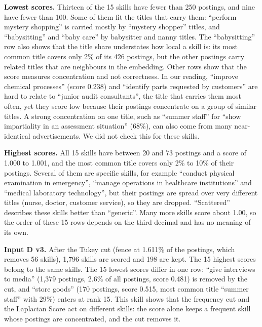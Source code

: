 \documentclass[
  letterpaper,
  DIV=11,
  numbers=noendperiod,
  sfdefaults=false]{scrartcl}
\begin{document}
\textbf{Lowest scores.} Thirteen of the 15 skills have fewer than 250
postings, and nine have fewer than 100. Some of them fit the titles that
carry them: ``perform mystery shopping'' is carried mostly by ``mystery
shopper'' titles, and ``babysitting'' and ``baby care'' by babysitter
and nanny titles. The ``babysitting'' row also shows that the title
share understates how local a skill is: its most common title covers
only 2\% of its 426 postings, but the other postings carry related
titles that are neighbours in the embedding. Other rows show that the
score measures concentration and not correctness. In our reading,
``improve chemical processes'' (score 0.238) and ``identify parts
requested by customers'' are hard to relate to ``junior audit
consultants'', the title that carries them most often, yet they score
low because their postings concentrate on a group of similar titles. A
strong concentration on one title, such as ``summer staff'' for ``show
impartiality in an assessment situation'' (68\%), can also come from
many near-identical advertisements. We did not check this for these
skills.

\textbf{Highest scores.} All 15 skills have between 20 and 73 postings
and a score of 1.000 to 1.001, and the most common title covers only 2\%
to 10\% of their postings. Several of them are specific skills, for
example ``conduct physical examination in emergency'', ``manage
operations in healthcare institutions'' and ``medical laboratory
technology'', but their postings are spread over very different titles
(nurse, doctor, customer service), so they are dropped. ``Scattered''
describes these skills better than ``generic''. Many more skills score
about 1.00, so the order of these 15 rows depends on the third decimal
and has no meaning of its own.

\textbf{Input D v3.} After the Tukey cut (fence at 1.611\% of the
postings, which removes 56 skills), 1,796 skills are scored and 198 are
kept. The 15 highest scores belong to the same skills. The 15 lowest
scores differ in one row: ``give interviews to media'' (1,379 postings,
2.6\% of all postings, score 0.481) is removed by the cut, and ``store
goods'' (170 postings, score 0.515, most common title ``summer staff''
with 29\%) enters at rank 15. This skill shows that the frequency cut
and the Laplacian Score act on different skills: the score alone keeps a
frequent skill whose postings are concentrated, and the cut removes it.
\end{document}
